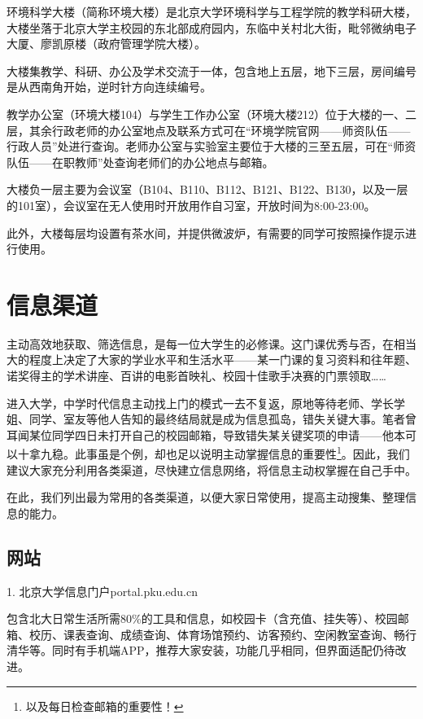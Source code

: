 \documentclass[11pt,oneside]{book}
\begin{document}
环境科学大楼（简称环境大楼）是北京大学环境科学与工程学院的教学科研大楼，大楼坐落于北京大学主校园的东北部成府园内，东临中关村北大街，毗邻微纳电子大厦、廖凯原楼（政府管理学院大楼）。

大楼集教学、科研、办公及学术交流于一体，包含地上五层，地下三层，房间编号是从西南角开始，逆时针方向连续编号。

教学办公室（环境大楼104）与学生工作办公室（环境大楼212）位于大楼的一、二层，其余行政老师的办公室地点及联系方式可在“环境学院官网——师资队伍——行政人员”处进行查询。老师办公室与实验室主要位于大楼的三至五层，可在“师资队伍——在职教师”处查询老师们的办公地点与邮箱。

大楼负一层主要为会议室（B104、B110、B112、B121、B122、B130，以及一层的101室），会议室在无人使用时开放用作自习室，开放时间为8:00-23:00。

此外，大楼每层均设置有茶水间，并提供微波炉，有需要的同学可按照操作提示进行使用。

\section{信息渠道}
主动高效地获取、筛选信息，是每一位大学生的必修课。这门课优秀与否，在相当大的程度上决定了大家的学业水平和生活水平——某一门课的复习资料和往年题、诺奖得主的学术讲座、百讲的电影首映礼、校园十佳歌手决赛的门票领取……

进入大学，中学时代信息主动找上门的模式一去不复返，原地等待老师、学长学姐、同学、室友等他人告知的最终结局就是成为信息孤岛，错失关键大事。笔者曾耳闻某位同学四日未打开自己的校园邮箱，导致错失某关键奖项的申请——他本可以十拿九稳。此事虽是个例，却也足以说明主动掌握信息的重要性\footnote{以及每日检查邮箱的重要性！}。因此，我们建议大家充分利用各类渠道，尽快建立信息网络，将信息主动权掌握在自己手中。

在此，我们列出最为常用的各类渠道，以便大家日常使用，提高主动搜集、整理信息的能力。

\subsection{网站}

1. 北京大学信息门户\quad portal.pku.edu.cn

包含北大日常生活所需80\%的工具和信息，如校园卡（含充值、挂失等）、校园邮箱、校历、课表查询、成绩查询、体育场馆预约、访客预约、空闲教室查询、畅行清华等。同时有手机端APP，推荐大家安装，功能几乎相同，但界面适配仍待改进。

\vspace{10pt}
\end{document}
